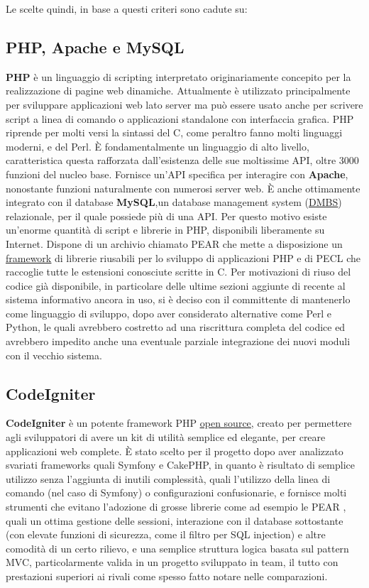 Le scelte quindi, in base a questi criteri sono cadute su:
\subsection{PHP, Apache e MySQL}
\textbf{PHP} \`e un linguaggio di scripting interpretato originariamente concepito per la realizzazione di pagine web dinamiche. Attualmente \`e utilizzato principalmente per sviluppare applicazioni web lato server ma pu\`o essere usato anche per scrivere script a linea di comando o applicazioni standalone con interfaccia grafica. PHP riprende per molti versi la sintassi del C, come peraltro fanno molti linguaggi moderni, e del Perl. \`E fondamentalmente un linguaggio di alto livello, caratteristica questa rafforzata dall'esistenza delle sue moltissime API, oltre 3000 funzioni del nucleo base. Fornisce un'API specifica per interagire con \textbf{Apache}, nonostante funzioni naturalmente con numerosi server web. \`E anche ottimamente integrato con il database \textbf{MySQL},un database management system (\hyperlink{dbms}{\underline{DMBS}}) relazionale, per il quale possiede pi\`u di una API. Per questo motivo esiste un'enorme quantit\`a di script e librerie in PHP, disponibili liberamente su Internet. Dispone di un archivio chiamato PEAR che mette a disposizione un \hyperlink{framework}{\underline{framework}} di librerie riusabili per lo sviluppo di applicazioni PHP e di PECL che raccoglie tutte le estensioni conosciute scritte in C. Per motivazioni di riuso del codice gi\`a disponibile, in particolare delle ultime sezioni aggiunte di recente al sistema informativo ancora in uso, si \`e deciso con il committente di mantenerlo come linguaggio di sviluppo, dopo aver considerato alternative come Perl e Python, le quali avrebbero costretto ad una riscrittura completa del codice ed avrebbero impedito anche una eventuale parziale integrazione dei nuovi moduli con il vecchio sistema.

\subsection{CodeIgniter}
\textbf{CodeIgniter} \` e un potente framework PHP \hyperlink{opensource}{\underline{open source}}, creato per permettere agli sviluppatori di avere un kit di utilit\` a semplice ed elegante, per creare applicazioni web complete. \` E stato scelto per il progetto dopo aver analizzato svariati frameworks quali Symfony e CakePHP, in quanto \` e risultato di semplice utilizzo senza l'aggiunta di inutili complessit\` a, quali l'utilizzo della linea di comando (nel caso di Symfony) o configurazioni confusionarie, e fornisce molti strumenti che evitano l'adozione di grosse librerie come ad esempio le PEAR \cite{uno}, quali un ottima gestione delle sessioni, interazione con il database sottostante (con elevate funzioni di sicurezza, come il filtro per SQL injection) e altre comodit\` a di un certo rilievo, e una semplice struttura logica basata sul pattern MVC, particolarmente valida in un progetto sviluppato in team, il tutto con prestazioni superiori ai rivali come spesso fatto notare nelle comparazioni.

